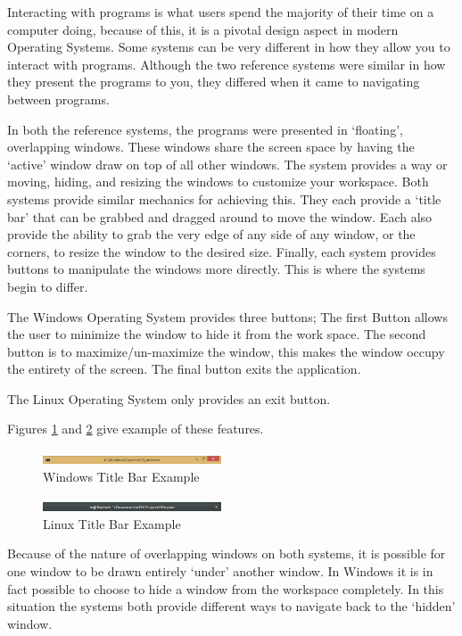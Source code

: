 \documentclass[a4paper]{report}
\begin{document}
Interacting with programs is what users spend the majority of their time on a computer doing, because of this, it is a pivotal design aspect in modern Operating Systems. Some systems can be very different in how they allow you to interact with programs. Although the two reference systems were similar in how they present the programs to you, they differed when it came to navigating between programs.

In both the reference systems, the programs were presented in `floating', overlapping windows. These windows share the screen space by having the `active' window draw on top of all other windows. The system provides a way or moving, hiding, and resizing the windows to customize your workspace. Both systems provide similar mechanics for achieving this. They each provide a `title bar' that can be grabbed and dragged around to move the window. Each also provide the ability to grab the very edge of any side of any window, or the corners, to resize the window to the desired size. Finally, each system provides buttons to manipulate the windows more directly. This is where the systems begin to differ.

The Windows Operating System provides three buttons; The first Button allows the user to minimize the window to hide it from the work space. The second button is to maximize/un-maximize the window, this makes the window occupy the entirety of the screen. The final button exits the application.

The Linux Operating System only provides an exit button.

Figures \ref{fig:WinTitleBarScreen} and \ref{fig:LinTitleBarScreen} give example of these features.

\begin{figure}[ht]
\centering
\includegraphics[width=200px]{images/Windows_title_bar_screenshot}
\caption{Windows Title Bar Example}
\label{fig:WinTitleBarScreen}
\end{figure}

\begin{figure}[ht]
\centering
\includegraphics[width=200px]{images/Linux_title_bar_screenshot}
\caption{Linux Title Bar Example}
\label{fig:LinTitleBarScreen}
\end{figure}

Because of the nature of overlapping windows on both systems, it is possible for one window to be drawn entirely `under' another window. In Windows it is in fact possible to choose to hide a window from the workspace completely. In this situation the systems both provide different ways to navigate back to the `hidden' window.
\end{document}
